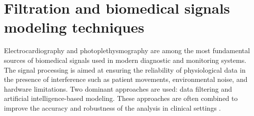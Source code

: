 \documentclass[journal]{IEEEtran}
\begin{document}
\newpage
\section{Filtration and biomedical signals modeling techniques}
Electrocardiography and photoplethysmography are among the most fundamental sources of biomedical signals used in modern diagnostic and monitoring systems. The signal processing is aimed at ensuring the reliability of physiological data in the presence of interference such as patient movements, environmental noise, and hardware limitations. Two dominant approaches are used: data filtering and artificial intelligence-based modeling. These approaches are often combined to improve the accuracy and robustness of the analysis in clinical settings \cite{1}.

\end{document}
